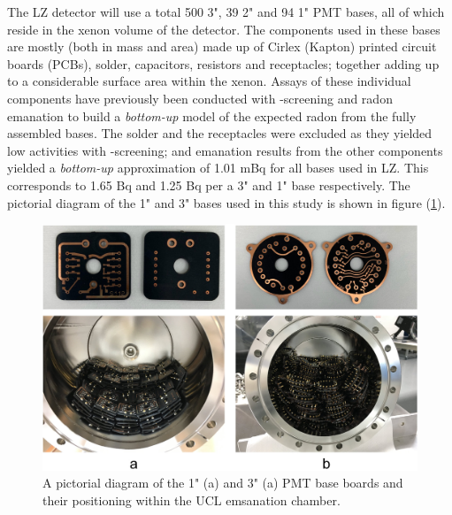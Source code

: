 The LZ detector will use a total 500 3", 39 2" and 94 1" PMT bases, all of which reside in the xenon volume of the detector. The components used in these bases are mostly (both in mass and area) made up of Cirlex (Kapton) printed circuit boards (PCBs), solder, capacitors, resistors and receptacles; together adding up to a considerable surface area within the xenon. Assays of these individual components have previously been conducted with \gamma{}-screening and radon emanation to build a \textit{bottom-up} model of the expected radon from the fully assembled bases. The solder and the receptacles were excluded as they yielded low \UTTEe{} activities with \gamma-screening; and emanation results from the other components yielded a \textit{bottom-up} approximation of 1.01 mBq for all bases used in LZ. This corresponds to 1.65 \micro{}Bq and 1.25 \micro{}Bq per a 3" and 1" base respectively. The pictorial diagram of the 1" and 3" bases used in this study is shown in figure (\ref{fig:1_and_3_inch_bases}).
%
\begin{figure}[b]
    \centering
    \includegraphics[scale=0.2]{Chapter_4/Figures/ucl_measurements/pmt_bases.jpg}
    \caption[A pictorial diagram of the 1" (a) and 3" (a) PMT base boards and their positioning within the UCL emsanation chamber.]
    {A pictorial diagram of the 1" (a) and 3" (a) PMT base boards and their positioning within the UCL emsanation chamber.}
    \label{fig:1_and_3_inch_bases}
\end{figure}
%
%

%

